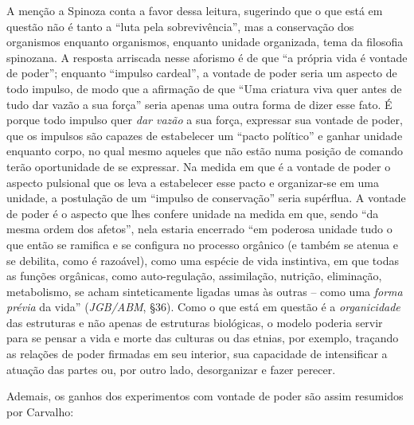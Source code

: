 \documentclass[
	12pt,				%
	openright,			%
	oneside,			%
	a4paper,			%
	english,			%
	french,				%
	spanish,			%
	brazil				%
	]{abntex2}
\begin{document}
A menção a Spinoza conta a favor dessa leitura, sugerindo que o que está em questão não é tanto a “luta pela sobrevivência”, mas a conservação dos organismos enquanto organismos, enquanto unidade organizada, tema da filosofia spinozana. A resposta arriscada nesse aforismo é de que “a própria vida é vontade de poder”; enquanto “impulso cardeal”, a vontade de poder seria um aspecto de todo impulso, de modo que a afirmação de que “Uma criatura viva quer antes de tudo dar vazão a sua força” seria apenas uma outra forma de dizer esse fato. É porque todo impulso quer \textit{dar vazão} a sua força, expressar sua vontade de poder, que os impulsos são capazes de estabelecer um “pacto político” e ganhar unidade enquanto corpo, no qual mesmo aqueles que não estão numa posição de comando terão oportunidade de se expressar. Na medida em que é a vontade de poder o aspecto pulsional que os leva a estabelecer esse pacto e organizar-se em uma unidade, a postulação de um “impulso de conservação” seria supérflua. A vontade de poder é o aspecto que lhes confere unidade na medida em que, sendo “da mesma ordem dos afetos”, nela estaria encerrado “em poderosa unidade tudo o que então se ramifica e se configura no processo orgânico (e também se atenua e se debilita, como é razoável), como uma espécie de vida instintiva, em que todas as funções orgânicas, como auto-regulação, assimilação, nutrição, eliminação, metabolismo, se acham sinteticamente ligadas umas às outras – como uma \textit{forma prévia} da vida” (\textit{JGB/ABM}, §36). Como o que está em questão é a \textit{organicidade} das estruturas e não apenas de estruturas biológicas, o modelo poderia servir para se pensar a vida e morte das culturas ou das etnias, por exemplo, traçando as relações de poder firmadas em seu interior, sua capacidade de intensificar a atuação das partes ou, por outro lado, desorganizar e fazer perecer.

	Ademais, os ganhos dos experimentos com vontade de poder são assim resumidos por Carvalho:
\end{document}
